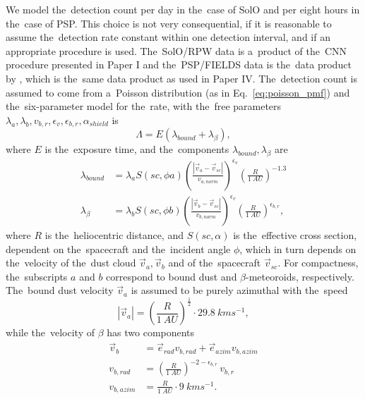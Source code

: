 We model the~detection count per day in the~case of SolO and per eight hours in the~case of PSP. This choice is not very consequential, if it is reasonable to assume the~detection rate constant within one detection interval, and if an appropriate procedure is used. The~SolO/RPW data is a~product of the~CNN procedure presented in Paper I and the~PSP/FIELDS data is the~data product by \citet{malaspina2023dust}, which is the~same data product as used in Paper IV. The~detection count is assumed to come from a~Poisson distribution (as in Eq.~\ref{eq:poisson_pmf}) and the~six-parameter model for the~rate, with the~free parameters $\lambda_a, \lambda_b, v_{b,r}, \epsilon_v, \epsilon_{b,r}, \alpha_{shield}$ is 
\begin{equation}
    \Lambda = E (\lambda_{bound} + \lambda_{\beta}),
\end{equation}
where $E$ is the~exposure time, and the~components $\lambda_{bound},\lambda_{\beta}$ are
\begin{equation}\begin{split}
    \lambda_{bound} &= \lambda_a  S(sc,\phi{a}) \left( \frac{|\vec{v}_{a} - \vec{v}_{sc}|}{v_{a,norm}}\right)^{\epsilon_v} \left( \frac{R}{\SI{1}{AU}} \right)^{-1.3} \\
    \lambda_{\beta} &= \lambda_b S(sc,\phi{b}) \left( \frac{|\vec{v}_{b} - \vec{v}_{sc}|}{v_{b,norm}}\right)^{\epsilon_v} \left( \frac{R}{\SI{1}{AU}} \right)^{\epsilon_{b,r}},
\end{split}\end{equation}
where $R$ is the~heliocentric distance, and $S(sc,\alpha)$ is the~effective cross section, dependent on the~spacecraft and the~incident angle $\phi$, which in turn depends on the~velocity of the~dust cloud $\vec{v}_a,\vec{v}_b$ and of the~spacecraft $\vec{v}_{sc}$. For compactness, the~subscripts $a$ and $b$ correspond to bound dust and $\beta$-meteoroids, respectively. The~bound dust velocity $\vec{v}_a$ is assumed to be purely azimuthal with the~speed
\begin{equation}
    |\vec{v}_a| = \left( \frac{R}{\SI{1}{AU}} \right)^\frac{1}{2} \cdot \SI{29.8}{kms^{-1}},
\end{equation}
while the~velocity of $\beta$ has two components
\begin{equation}\begin{split}
    \vec{v}_b &= \vec{e}_{rad} v_{b,rad} + \vec{e}_{azim} v_{b,azim} \\
    v_{b,rad} &= \left( \frac{R}{\SI{1}{AU}} \right)^{-2-\epsilon_{b,r}} \, v_{b,r} \\
    v_{b,azim} &= \frac{R}{\SI{1}{AU}} \cdot \SI{9}{kms^{-1}}.
\end{split}\end{equation}
